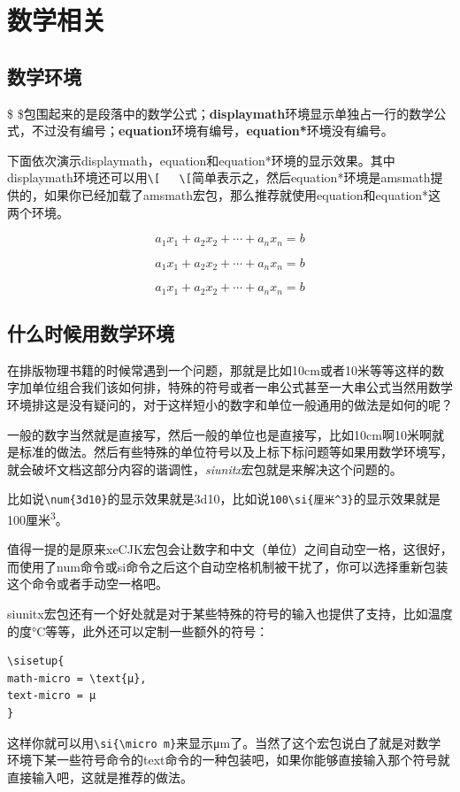 \documentclass[11pt,oneside]{book}
\begin{document}
\chapter{数学相关}

\section{数学环境}
\$ \$包围起来的是段落中的数学公式；\textbf{displaymath}环境显示单独占一行的数学公式，不过没有编号；\textbf{equation}环境有编号，\textbf{equation*}环境没有编号。

下面依次演示displaymath，equation和equation*环境的显示效果。其中displaymath环境还可以用\verb+\[   \[+简单表示之，然后equation*环境是amsmath提供的，如果你已经加载了amsmath宏包，那么推荐就使用equation和equation*这两个环境。

\begin{displaymath}
a_1x_1 + a_2x_2 + \cdots + a_nx_n = b
\end{displaymath}

\begin{equation}
a_1x_1 + a_2x_2 + \cdots + a_nx_n = b
\end{equation}


\begin{equation*}
a_1x_1 + a_2x_2 + \cdots + a_nx_n = b
\end{equation*}



\section{什么时候用数学环境}
在排版物理书籍的时候常遇到一个问题，那就是比如10cm或者10米等等这样的数字加单位组合我们该如何排，特殊的符号或者一串公式甚至一大串公式当然用数学环境排这是没有疑问的，对于这样短小的数字和单位一般通用的做法是如何的呢？

一般的数字当然就是直接写，然后一般的单位也是直接写，比如10cm啊10米啊就是标准的做法。然后有些特殊的单位符号以及上标下标问题等如果用数学环境写，就会破坏文档这部分内容的谐调性，\emph{siunitx}宏包就是来解决这个问题的。

比如说\verb+\num{3d10}+的显示效果就是\num{3d10}，比如说\verb+100\si{厘米^3}+的显示效果就是100\si{厘米^3}。

值得一提的是原来xeCJK宏包会让数字和中文（单位）之间自动空一格，这很好，而使用了num命令或si命令之后这个自动空格机制被干扰了，你可以选择重新包装这个命令或者手动空一格吧。

siunitx宏包还有一个好处就是对于某些特殊的符号的输入也提供了支持，比如温度的度\si{\degreeCelsius}等等，此外还可以定制一些额外的符号：
\begin{Verbatim}
\sisetup{
math-micro = \text{μ},
text-micro = μ
}
\end{Verbatim}
这样你就可以用\verb+\si{\micro m}+来显示\si{\micro m}了。当然了这个宏包说白了就是对数学环境下某一些符号命令的text命令的一种包装吧，如果你能够直接输入那个符号就直接输入吧，这就是推荐的做法。
\end{document}
